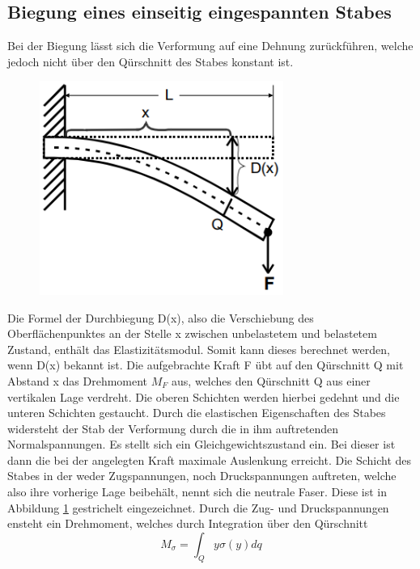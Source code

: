 \subsection{Biegung eines einseitig eingespannten Stabes}
Bei der Biegung lässt sich die Verformung auf eine Dehnung zurückführen, welche jedoch nicht über den Qürschnitt des Stabes konstant ist. 
\begin{figure}[H]
    \centering
    \captionsetup{justification=centering}
    \includegraphics[height=7cm]{"Einseitig_Biegung.png"}
    \label{Fig:Einseitig}
\end{figure}
Die Formel der Durchbiegung D(x), also die Verschiebung des Oberflächenpunktes an der Stelle x zwischen unbelastetem und belastetem Zustand, enthält das Elastizitätsmodul. Somit kann dieses berechnet werden, wenn D(x) bekannt ist. Die aufgebrachte Kraft F übt auf den Qürschnitt Q mit Abstand x das Drehmoment $M_F$ aus, welches den Qürschnitt Q aus einer vertikalen Lage verdreht. Die oberen Schichten werden hierbei gedehnt und die unteren Schichten gestaucht. Durch die elastischen Eigenschaften des Stabes widersteht der Stab der Verformung durch die in ihm auftretenden Normalspannungen. Es stellt sich ein Gleichgewichtszustand ein. Bei dieser ist dann die bei der angelegten Kraft maximale Auslenkung erreicht. Die Schicht des Stabes in der weder Zugspannungen, noch Druckspannungen auftreten, welche also ihre vorherige Lage beibehält, nennt sich die neutrale Faser. Diese ist in Abbildung \ref{Fig:Einseitig} gestrichelt eingezeichnet.
Durch die Zug- und Druckspannungen ensteht ein Drehmoment, welches durch Integration über den Qürschnitt 
\begin{equation}
    M_{\sigma}=\int_Qy\sigma(y)dq
\end{equation}
